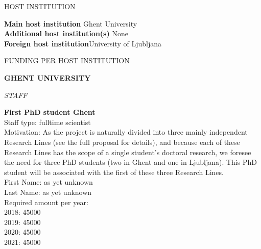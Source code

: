 \documentclass[11pt,dvipsnames,usenames,a4paper]{article}
\begin{document}
\vspace{10pt}

\begin{shaded}\centering HOST INSTITUTION \end{shaded}
\textbf{Main host institution} \tab Ghent University \\
\textbf{Additional host institution(s)} \tab None\\
\textbf{Foreign host institution}\tab University of Ljubljana \\

\newpage

\begin{shaded}\centering FUNDING PER HOST INSTITUTION \end{shaded}










{\bf GHENT UNIVERSITY}

{\it STAFF}

{\bf First PhD student Ghent}\\
Staff type: fulltime scientist\\
Motivation: As the project is naturally divided into three mainly independent Research Lines (see the full proposal for details), and because each of these Research Lines has the scope of a single student's doctoral research, we foresee the need for three PhD students (two in Ghent and one in Ljubljana). This PhD student will be associated with the first of these three Research Lines. \\
First Name: as yet unknown\\
Last Name: as yet unknown\\
Required amount per year:\\
2018: 45000\\
2019: 45000\\
2020: 45000\\
2021: 45000
\end{document}
